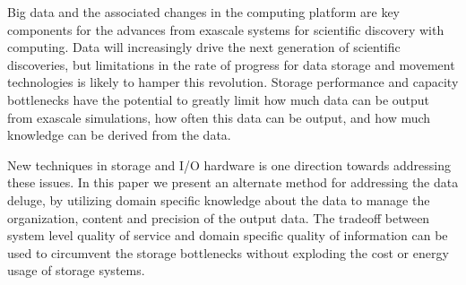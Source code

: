 \documentclass{sig-alt-gov2}
\begin{document}
\begin{comment}
  As the exascale computing age emerges, data related issues are becoming
  critical factors that determine how and where we do computing. Popular
  approaches used by traditional I/O solution and storage libraries become
  increasingly bottlenecked due to their assumptions about data movement,
  re-organization, and storage. While, new technologies, such as ``burst
  buffers'', can help address some of the short-term performance issues, it is
  essential that we reexamine the underlying storage and I/O infrastructure to
  effectively support requirements and challenges at exascale and beyond.

  In this paper we present
  - different data needs different techniques
  - write overhead for the different refactoring/auditing approaches
  - derived quantities in viz after precision based refactoring and differences
  from full fidelity data sets.
  - linear auditing approaches for data refactoring and the effects on data
  sizes, io performance, and viz quality. Do every point, but split at 24 bits
  and 40 bits.
\end{comment}

\begin{comment}
  Be sure to address the following:\\
  1. Why should Chang or Chen care from the apps side.\\
  2. why should ken or hank care from the viz side\\
  3. why would Garth care from the storage side\\
\end{comment}

Big data and the associated changes in the computing platform are key
components for the advances from exascale systems for scientific discovery
with computing. Data will increasingly drive the next generation of scientific
discoveries, but limitations in the rate of progress for data storage and
movement technologies is likely to hamper this revolution. Storage performance
and capacity bottlenecks have the potential to greatly limit how much data can
be output from exascale simulations, how often this data can be output, and
how much knowledge can be derived from the data.

New techniques in storage and I/O hardware is one direction towards addressing
these issues. In this paper we present an alternate method for addressing the
data deluge, by utilizing domain specific knowledge about the data to manage
the organization, content and precision of the output data. The tradeoff
between system level quality of service and domain specific quality of
information can be used to circumvent the storage bottlenecks without
exploding the cost or energy usage of storage systems.
\end{document}
